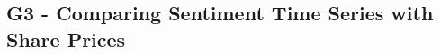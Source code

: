 




\subsection{G3 - Comparing Sentiment Time Series with Share Prices}
\label{ss:conclusion-summary-g3}

